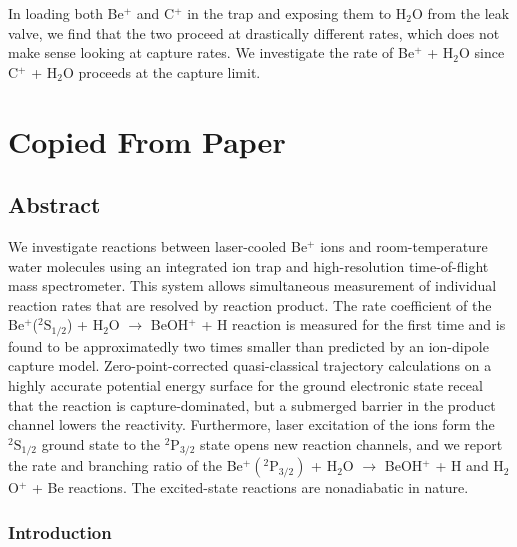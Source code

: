 In loading both Be$^+$ and C$^+$ in the trap and exposing them to H$_2$O from the leak valve, we find that the two proceed at drastically different rates, which does not make sense looking at capture rates. We investigate the rate of Be$^+$ + H$_2$O since C$^+$ + H$_2$O proceeds at the capture limit.

\section{Copied From Paper}

\subsection{Abstract}
We investigate reactions between laser-cooled Be$^+$ ions and room-temperature water molecules using an integrated ion trap and high-resolution time-of-flight mass spectrometer. This system allows simultaneous measurement of individual reaction rates that are resolved by reaction product. The rate coefficient of the Be$^+$($^2\text{S}_{1/2}$) + H$_2$O $\rightarrow$ BeOH$^+$ + H reaction is measured for the first time and is found to be approximatedly two times smaller than predicted by an ion-dipole capture model. Zero-point-corrected quasi-classical trajectory calculations on a highly accurate potential energy surface for the ground electronic state receal that the reaction is capture-dominated, but a submerged barrier in the product channel lowers the reactivity. Furthermore, laser excitation of the ions form the $^2\text{S}_{1/2}$ ground state to the $^2\text{P}_{3/2}$ state opens new reaction channels, and we report the rate and branching ratio of the Be$^+(^2\text{P}_{3/2})$ + H$_2$O $\rightarrow$ BeOH$^+$ + H and H$_2$O$^+$ + Be reactions. The excited-state reactions are nonadiabatic in nature.

\subsubsection{Introduction}

